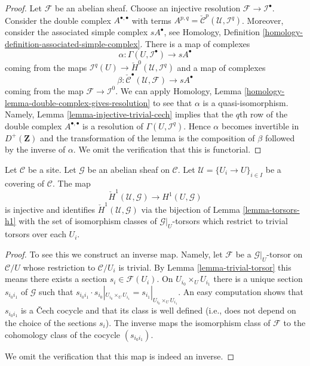 \begin{proof}
Let $\mathcal{F}$ be an abelian sheaf. Choose an injective resolution
$\mathcal{F} \to \mathcal{I}^\bullet$. Consider the double complex
$A^{\bullet, \bullet}$ with terms
$A^{p, q} = \check{\mathcal{C}}^p(\mathcal{U}, \mathcal{I}^q)$.
Moreover, consider the associated simple complex
$sA^\bullet$, see
Homology, Definition \ref{homology-definition-associated-simple-complex}.
There is a map of complexes
$$
\alpha :
\Gamma(U, \mathcal{I}^\bullet)
\longrightarrow
sA^\bullet
$$
coming from the maps
$\mathcal{I}^q(U) \to \check{H}^0(\mathcal{U}, \mathcal{I}^q)$
and a map of complexes
$$
\beta :
\check{\mathcal{C}}^\bullet(\mathcal{U}, \mathcal{F})
\longrightarrow
sA^\bullet
$$
coming from the map $\mathcal{F} \to \mathcal{I}^0$.
We can apply
Homology, Lemma \ref{homology-lemma-double-complex-gives-resolution}
to see that $\alpha$ is a quasi-isomorphism.
Namely, Lemma \ref{lemma-injective-trivial-cech} implies that
the $q$th row of the double complex $A^{\bullet, \bullet}$ is a
resolution of $\Gamma(U, \mathcal{I}^q)$.
Hence $\alpha$ becomes invertible in $D^{+}(\mathbf{Z})$ and
the transformation of the lemma is the composition of $\beta$
followed by the inverse of $\alpha$. We omit the verification
that this is functorial.
\end{proof}

\begin{lemma}
\label{lemma-cech-h1}
Let $\mathcal{C}$ be a site. Let $\mathcal{G}$ be an abelian sheaf
on $\mathcal{C}$. Let $\mathcal{U} = \{U_i \to U\}_{i \in I}$ be a
covering of $\mathcal{C}$. The map
$$
\check{H}^1(\mathcal{U}, \mathcal{G})
\longrightarrow
H^1(U, \mathcal{G})
$$
is injective and identifies $\check{H}^1(\mathcal{U}, \mathcal{G})$ via
the bijection of Lemma \ref{lemma-torsors-h1}
with the set of isomorphism classes of $\mathcal{G}|_U$-torsors
which restrict to trivial torsors over each $U_i$.
\end{lemma}

\begin{proof}
To see this we construct an inverse map. Namely, let $\mathcal{F}$ be a
$\mathcal{G}|_U$-torsor on $\mathcal{C}/U$ whose restriction to
$\mathcal{C}/U_i$ is trivial. By Lemma \ref{lemma-trivial-torsor}
this means there
exists a section $s_i \in \mathcal{F}(U_i)$. On $U_{i_0} \times_U U_{i_1}$
there is a unique section $s_{i_0i_1}$ of $\mathcal{G}$ such that
$s_{i_0i_1} \cdot s_{i_0}|_{U_{i_0} \times_U U_{i_1}} =
s_{i_1}|_{U_{i_0} \times_U U_{i_1}}$. An easy computation shows
that $s_{i_0i_1}$ is a {\v C}ech cocycle and that its class is well
defined (i.e., does not depend on the choice of the sections $s_i$).
The inverse maps the isomorphism class of $\mathcal{F}$ to the cohomology
class of the cocycle $(s_{i_0i_1})$.

\medskip\noindent
We omit the verification that this map is indeed an inverse.
\end{proof}

